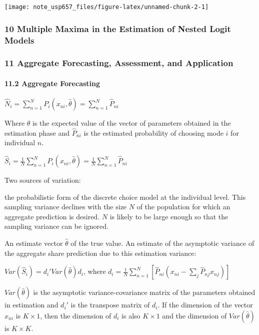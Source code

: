 \documentclass[
]{article}
\begin{document}
\texttt{[image: note\_usp657\_files/figure-latex/unnamed-chunk-2-1]}

\hypertarget{multiple-maxima-in-the-estimation-of-nested-logit-models}{%
\subsubsection{10 Multiple Maxima in the Estimation of Nested Logit
Models}\label{multiple-maxima-in-the-estimation-of-nested-logit-models}}

\hypertarget{aggregate-forecasting-assessment-and-application}{%
\subsubsection{11 Aggregate Forecasting, Assessment, and
Application}\label{aggregate-forecasting-assessment-and-application}}

\hypertarget{aggregate-forecasting}{%
\paragraph{11.2 Aggregate Forecasting}\label{aggregate-forecasting}}

\(\hat N_i=\sum_{n=1}^NP_i(x_{ni},\hat\theta)=\sum_{n=1}^N\hat P_{ni}\)

Where \(\theta\) is the expected value of the vector of parameters
obtained in the estimation phase and \(\hat P_{ni}\) is the estimated
probability of choosing mode \(i\) for individual \(n\).

\(\hat S_i=\frac1N\sum_{n=1}^NP_i(x_{ni},\hat\theta)=\frac1N\sum_{n=1}^N\hat P_{ni}\)

Two sources of variation:

the probabilistic form of the discrete choice model at the individual
level. This sampling variance declines with the size \(N\) of the
population for which an aggregate prediction is desired. \(N\) is likely
to be large enough so that the sampling variance can be ignored.

An estimate vector \(\hat\theta\) of the true value. An estimate of the
asymptotic variance of the aggregate share prediction due to this
estimation variance:

\(Var(\hat S_i)=d_i'Var(\hat\theta)d_i\), where
\(d_i=\frac1N\sum_{n=1}^N[\hat P_{ni}(x_{ni}-\sum_j\hat P_{nj}x_{nj})]\)

\(Var(\hat\theta)\) is the asymptotic variance-covariance matrix of the
parameters obtained in estimation and \(d_i'\) is the transpose matrix
of \(d_i\). If the dimension of the vector \(x_{ni}\) is \(K\times1\),
then the dimension of \(d_i\) is also \(K\times1\) and the dimension of
\(Var(\hat\theta)\) is \(K\times K\).
\end{document}
